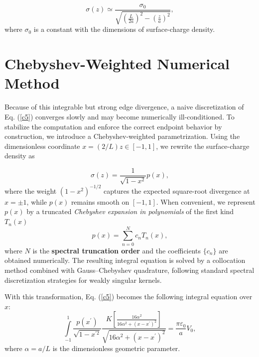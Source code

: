 \documentclass[12pt]{article}
\begin{document}
\begin{equation}
\sigma(z)\simeq\frac{\sigma_{0}}{\sqrt{\left(  \frac{L}{2a}\right)
^{2}-\left(  \frac{z}{a}\right)  ^{2}}}, \label{c8}%
\end{equation}
where $\sigma_{0}$ is a constant with the dimensions of surface-charge density.

\section{Chebyshev-Weighted Numerical Method}

Because of this integrable but strong edge divergence, a naive discretization
of Eq. (\ref{c5}) converges slowly and may become numerically ill-conditioned.
To stabilize the computation and enforce the correct endpoint behavior by
construction, we introduce a Chebyshev-weighted parametrization. Using the
dimensionless coordinate $x=(2/L)z\in\left[  -1,1\right]  $, we rewrite the
surface-charge density as%

\begin{equation}
\sigma(z)=\frac{1}{\sqrt{1-x^{2}}}p(x), \label{c9}%
\end{equation}
where the weight $\left(  1-x^{2}\right)  ^{-1/2}$ captures the expected
square-root divergence at $x=\pm1$, while $p(x)$ remains smooth on $\left[
-1,1\right]  $. When convenient, we represent $p(x)$ by a truncated
\textit{Chebyshev expansion in polynomials} of the first kind $T_{n}%
(x)$\cite{tn1,tn2,tn3}
\begin{equation}
p(x)=\sum\limits_{n=0}^{N}c_{n}T_{n}(x), \label{c10}%
\end{equation}
where $N$ is the \textbf{spectral truncation order} and the coefficients
$\{c_{n}\}$ are obtained numerically. The resulting integral equation is
solved by a collocation method combined with Gauss--Chebyshev quadrature,
following standard spectral discretization strategies for weakly singular
kernels\cite{tn4,tn5,tn6}.

With this transformation, Eq. (\ref{c5}) becomes the following integral
equation over $x$:%
\begin{equation}
\int\limits_{-1}^{1}\frac{p(x^{\prime})}{\sqrt{1-x^{\prime2}}}\frac{K\left[
\frac{16\alpha^{2}}{16\alpha^{2}+\left(  x-x^{\prime}\right)  ^{2}}\right]
}{\sqrt{16\alpha^{2}+\left(  x-x^{\prime}\right)  ^{2}}}=\frac{\pi
\varepsilon_{0}}{a}V_{0}, \label{c11}%
\end{equation}
where $\alpha=a/L$ is the dimensionless geometric parameter.
\end{document}
